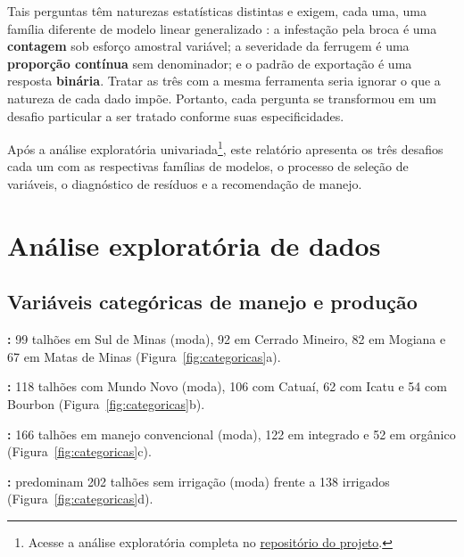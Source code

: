 Tais perguntas têm naturezas estatísticas distintas e exigem, cada uma, uma família diferente de modelo linear 
generalizado \cite{nelder1972,mccullagh1989}: a infestação pela broca é uma \textbf{contagem} sob esforço amostral variável; 
a severidade da ferrugem é uma \textbf{proporção contínua} sem denominador; 
e o padrão de exportação é uma resposta \textbf{binária}. 
Tratar as três com a mesma ferramenta seria ignorar o que a natureza de cada dado impõe. Portanto, cada pergunta se transformou
em um desafio particular a ser tratado conforme suas especificidades.

Após a análise exploratória univariada\footnote{Acesse a análise exploratória completa no \href{https://github.com/leticiazorzirama/generalized_linear_models_coffee_farming/blob/main/exploratory_analysis/exploratory_analysis.R}{repositório do projeto}.}, 
este relatório apresenta os três desafios cada um com as respectivas famílias de modelos, o processo de seleção de variáveis, 
o diagnóstico de resíduos e a recomendação de manejo.

\section{Análise exploratória de dados}

\subsection{Variáveis categóricas de manejo e produção}
 
\textbf{:} 99 talhões em Sul de Minas (moda), 92 em Cerrado Mineiro, 82 em Mogiana e 67 em Matas de Minas (Figura~\ref{fig:categoricas}a).
 
\textbf{:} 118 talhões com Mundo Novo (moda), 106 com Catuaí, 62 com Icatu e 54 com Bourbon (Figura~\ref{fig:categoricas}b).
 
\textbf{:} 166 talhões em manejo convencional (moda), 122 em integrado e 52 em orgânico (Figura~\ref{fig:categoricas}c).
 
\textbf{:} predominam 202 talhões sem irrigação (moda) frente a 138 irrigados (Figura~\ref{fig:categoricas}d).
 
